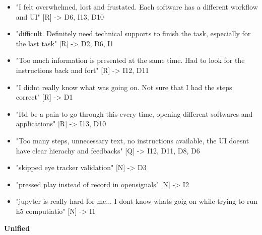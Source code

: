 \documentclass[
]{article}
\begin{document}
\begin{itemize}
\item
  "I felt overwhelmed, lost and frustated. Each software has a different workflow and UI" {[}R{]} -\textgreater{} D6, I13, D10
\item
  "difficult. Definitely need technical supports to finish the task, especially for the last task" {[}R{]} -\textgreater{} D2, D6, I1
\item
  "Too much information is presented at the same time. Had to look for the instructions back and fort" {[}R{]} -\textgreater{} I12, D11
\item
  "I didn\textquotesingle t really know what was going on. Not sure that I had the steps correct" {[}R{]} -\textgreater{} D1
\item
  "It\textquotesingle d be a pain to go through this every time, opening different softwares and applications" {[}R{]} -\textgreater{} I13, D10
\item
  "Too many steps, unnecessary text, no instructions available, the UI doesn\textquotesingle t have clear hierachy and feedbacks" {[}Q{]} -\textgreater{} I12, D11, D8, D6
\item
  "skipped eye tracker validation" {[}N{]} -\textgreater{} D3
\item
  "pressed play instead of record in opensignals" {[}N{]} -\textgreater{} I2
\item
  "jupyter is really hard for me... I dont know whats goig on while trying to run h5 computiatio" {[}N{]} -\textgreater{} I1
\end{itemize}

\textbf{Unified}
\end{document}
